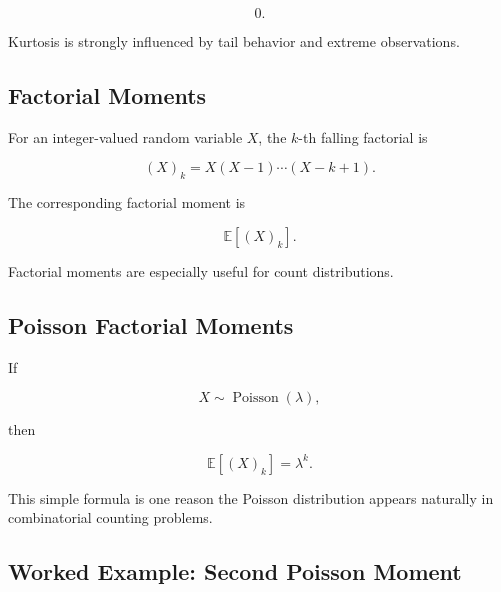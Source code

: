\[
\boxed{
0.
}
\]

Kurtosis is strongly influenced by tail behavior and extreme
observations.

\subsection{Factorial Moments}
\label{subsec:factorial-moments}

For an integer-valued random variable \(X\), the \(k\)-th falling
factorial is

\[
(X)_k
=
X(X-1)\cdots(X-k+1).
\]

The corresponding factorial moment is

\[
\boxed{
\mathbb{E}[(X)_k].
}
\]

Factorial moments are especially useful for count distributions.

\subsection{Poisson Factorial Moments}
\label{subsec:poisson-factorial-moments}

If

\[
X\sim\operatorname{Poisson}(\lambda),
\]

then

\[
\boxed{
\mathbb{E}[(X)_k]
=
\lambda^k.
}
\]

This simple formula is one reason the Poisson distribution appears
naturally in combinatorial counting problems.

\subsection{Worked Example: Second Poisson Moment}
\label{subsec:worked-poisson-second-moment}

